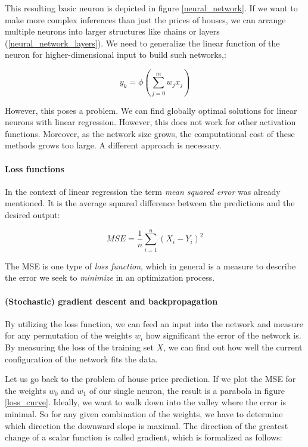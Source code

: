 This resulting basic neuron is depicted in figure \ref{neural_network}. If we want to make more complex inferences than just the prices of houses, we can arrange multiple neurons into larger structures like chains or layers (\ref{neural_network_layers}). We need to generalize the linear function of the neuron for higher-dimensional input to build such networks,:

\begin{equation}
    y_k = \phi\left(\sum_{j=0}^{m}w_jx_j\right)
\end{equation}

However, this poses a problem. We can find globally optimal solutions for linear neurons with linear regression. However, this does not work for other activation functions. Moreover, as the network size grows, the computational cost of these methods grows too large. A different approach is necessary.

\paragraph{Loss functions} In the context of linear regression the term \textit{mean squared error} was already mentioned. It is the average squared difference between the predictions and the desired output:

\begin{equation}
    MSE = \frac{1}{n} \sum_{i = 1}^{n}(X_i - Y_i)^2
\end{equation}

The MSE is one type of \textit{loss function}, which in general is a measure to describe the error we seek to \textit{minimize} in an optimization process.

\paragraph{(Stochastic) gradient descent and backpropagation} By utilizing the loss function, we can feed an input into the network and measure for any permutation of the weights $ w_i $ how significant the error of the network is. By measuring the loss of the training set $ X $, we can find out how well the current configuration of the network fits the data.

Let us go back to the problem of house price prediction. If we plot the MSE for the weights $ w_0 $ and $ w_1 $ of our single neuron, the result is a parabola in figure \ref{loss_curve}. Ideally, we want to walk down into the valley where the error is minimal. So for any given combination of the weights, we have to determine which direction the downward slope is maximal. The direction of the greatest change of a scalar function is called gradient, which is formalized as follows:


